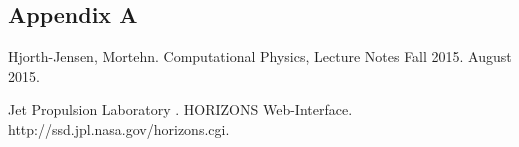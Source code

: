 \documentclass[%
oneside,                 %
final,                   %
10pt]{article}
\begin{document}
\subsection{Appendix A} \label{A}

\begin{thebibliography}{9}

Hjorth-Jensen, Mortehn. 
Computational Physics, Lecture Notes Fall 2015. 
August 2015.

Jet Propulsion Laboratory .
HORIZONS Web-Interface. 
http://ssd.jpl.nasa.gov/horizons.cgi.


\end{thebibliography}



\end{document}
